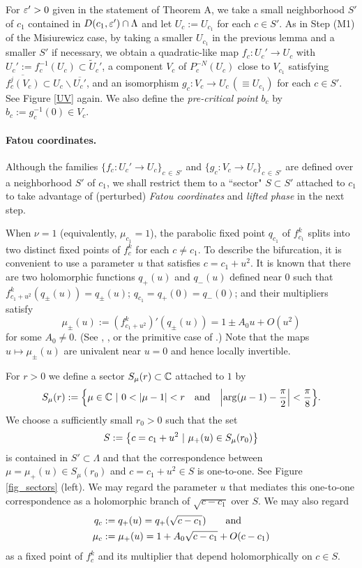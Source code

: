 For $ \varepsilon'>0$ given in the statement of Theorem A,
we take a small neighborhood $S'$ of $c_1$ 
contained in $D(c_1, \varepsilon') \cap \Lambda$ and 
let $U_c := U_{c_1}$ for each $c \in S'$.
As in Step (M1) of the Misiurewicz case,
by taking a smaller $U_{c_1}$ in the previous lemma
and a smaller $S'$ if necessary,
we obtain a quadratic-like map $f_c:U_c' \to U_c$
with $U_c':=f_c^{-1}(U_c) \subset \widetilde{U}_{c}'$,
a component $V_c$ of $P_c^{-N}(U_c)$ 
 close to $V_{c_1}$ satisfying 
 $\overline{f_c^j(V_c)} \subset U_c \smallsetminus \overline{U_c'}$,
and an isomorphism $g_c : V_c \to U_c \,(\equiv U_{c_1})$ 
for each $c \in S'$.
See 
Figure \ref{UV} again. 
We also define the {\it pre-critical point} $b_c$
by $b_c:=g_c^{-1}(0) \in V_c$.


\paragraph{\bf Fatou coordinates.}
Although the families $\{f_c:U_c' \to U_c\}_{c \, \in \, S'}$
and 
$\{g_c:V_c \to U_c\}_{c \, \in \, S'}$ 
are defined over a neighborhood $S'$ of $c_1$,
we shall restrict them to 
a ``sector" $S \subset S'$ attached to $c_1$
to take advantage of (perturbed) {\it Fatou coordinates} 
and {\it lifted phase} in the next step. 


When $\nu=1$ (equivalently, $\mu_{c_1}=1$), 
the parabolic fixed point $q_{c_1}$ of $f_{c_1}^k$ 
splits into two distinct fixed points of 
$f_c^k$ for each $c \neq c_1$. 
To describe the bifurcation, 
it is convenient to use a parameter $u$ that satisfies $c=c_1+u^2$. 
It is known that there are two holomorphic functions 
$q_+(u)$ and $q_-(u)$ defined near $0$ such that 
$f_{c_1+u^2}^k(q_\pm(u))=q_\pm(u)$; 
$q_{c_1}=q_+(0)=q_-(0)$; and their multipliers satisfy
$$
\mu_\pm(u) := (f_{c_1+u^2}^k)'(q_\pm(u))=1 \pm A_0 u + O(u^2)
$$
for some $A_0 \neq 0$. 
(See \cite[Expos\'e XI]{DH Orsay}, \cite[Theorem 1.1 (c)]{Tan Lei 2000},
 or the primitive case of \cite[Lemma 4.2]{Milnor 2000}.)
Note that the maps $u \mapsto \mu_\pm(u)$ are univalent near $u=0$
and hence locally invertible. 

For $r > 0$ we define 
a sector $S_\mu(r) \subset \mathbb C$ attached to $1$ by
$$
S_\mu(r):=\braces{\mu \in \C \st 
0<|\mu-1|<r
~~~
\text{and}~~~
\abs{\arg (\mu -1)-\frac{\pi}{2}}<\frac{\pi}{8}
}.
$$
We choose a sufficiently small $r_0>0$ such that 
the set
$$
S:={\left\{ c=c_1+u^2  \ | \  \mu_+(u) \in S_\mu(r_0) \right\}}
$$
is contained in $S' \subset \Lambda$ 
and that the correspondence between $\mu=\mu_+(u) \in S_\mu(r_0)$ 
and $c=c_1+u^2 \in S$ is one-to-one.
See Figure \ref{fig_sectors} (left).
We may regard the parameter $u$ that 
mediates this one-to-one correspondence 
as a holomorphic branch of $\sqrt{c-c_1}$ over $S$.
We may also regard 
\begin{align}
q_c&:=q_+(u)=q_+(\sqrt{c-c_1})\qquad \text{and} \notag\\
\mu_c&:=\mu_+(u)=1+A_0 \sqrt{c-c_1} + O(c-c_1) \label{eq_A_0}
\end{align}
as a fixed point of $f_c^k$ and its multiplier that depend
holomorphically on $c \in S$.

